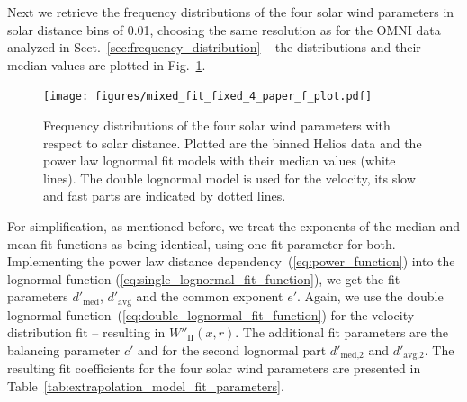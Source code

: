\documentclass[]{aa}
\begin{document}
	Next we retrieve the frequency distributions of the four solar wind parameters in solar distance bins of \SI{0.01}{\au}, choosing the same resolution as for the OMNI data analyzed in Sect.~\ref{sec:frequency_distribution} -- the distributions and their median values are plotted in Fig.~\ref{fig:mixed_fit_fixed_4_paper_f_plot}.
	\begin{figure}
		\texttt{[image: figures/mixed\_fit\_fixed\_4\_paper\_f\_plot.pdf]}
		\caption{Frequency distributions of the four solar wind parameters with respect to solar distance. Plotted are the binned Helios data and the power law lognormal fit models with their median values (white lines). The double lognormal model is used for the velocity, its slow and fast parts are indicated by dotted lines.}
		\label{fig:mixed_fit_fixed_4_paper_f_plot}
	\end{figure}
	For simplification, as mentioned before, we treat the exponents of the median and mean fit functions as being identical, using one fit parameter for both. Implementing the power law distance dependency~(\ref{eq:power_function}) into the lognormal function (\ref{eq:single_lognormal_fit_function}), we get the fit parameters $d'_\text{med}$, $d'_\text{avg}$ and the common exponent $e'$. Again, we use the double lognormal function~(\ref{eq:double_lognormal_fit_function}) for the velocity distribution fit -- resulting in $W''_\text{II}(x,r)$. The additional fit parameters are the balancing parameter $c'$ and for the second lognormal part $d'_\text{med,2}$ and $d'_\text{avg,2}$. The resulting fit coefficients for the four solar wind parameters are presented in Table~\ref{tab:extrapolation_model_fit_parameters}.
\end{document}
